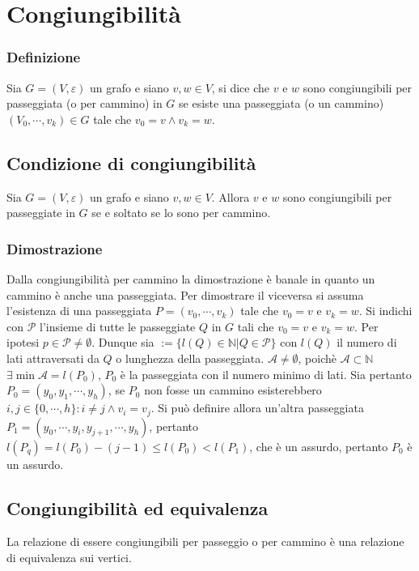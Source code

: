 \section{Congiungibilit\`a}
\subsubsection{Definizione}
Sia $G=(V,\varepsilon)$ un grafo e siano $v,w\in V$, si dice che $v$ e $w$ sono congiungibili per passeggiata (o per cammino) in $G$ se esiste una passeggiata (o un cammino) 
$(V_0,\cdots, v_k)\in G$ tale che $v_0=v\wedge v_k=w$.
\subsection{Condizione di congiungibilit\`a}
Sia $G=(V,\varepsilon)$ un grafo e siano $v,w\in V$. Allora $v$ e $w$ sono congiungibili per passeggiate in $G$ se e soltato se lo sono per cammino.
\subsubsection{Dimostrazione} 
Dalla congiungibilit\`a per cammino la dimostrazione \`e banale in quanto un cammino \`e anche una passeggiata. Per dimostrare il viceversa si assuma
l'esistenza di una passeggiata $P=(v_0,\cdots, v_k)$ tale che $v_0=v$ e $v_k=w$. Si indichi con $\mathcal{P}$ l'insieme di tutte le passeggiate $Q$ in $G$ tali che $v_0=v$ e 
$v_k=w$. Per ipotesi $p\in\mathcal{P}\neq\emptyset$. Dunque sia $\mathcal:=\{l(Q)\in\mathbb{N}|Q\in\mathcal{P}\}$ con $l(Q)$ il numero di lati attraversati da $Q$ o lunghezza 
della passeggiata. $\mathcal{A}\neq\emptyset$, poich\`e $\mathcal{A}\subset\mathbb{N}$ $\exists\min\mathcal{A}=l(P_0)$, $P_0$ \`e la passeggiata con il numero minimo di lati.
Sia pertanto $P_0=(y_0,y_1,\cdots, y_h)$, se $P_0$ non fosse un cammino esisterebbero $i,j\in\{0,\cdots, h\}:i\neq j\wedge v_i=v_j$. Si pu\`o definire allora un'altra 
passeggiata $P_1=(y_0,\cdots, y_i,y_{j+1}, \cdots, y_h)$, pertanto $l(P_q)=l(P_0)-(j-1)\le l(P_0)<l(P_1)$, che \`e un assurdo, pertanto $P_0$ \`e un assurdo. 
\subsection{Congiungibilit\`a ed equivalenza}
La relazione di essere congiungibili per passeggio o per cammino \`e una relazione di equivalenza sui vertici.
